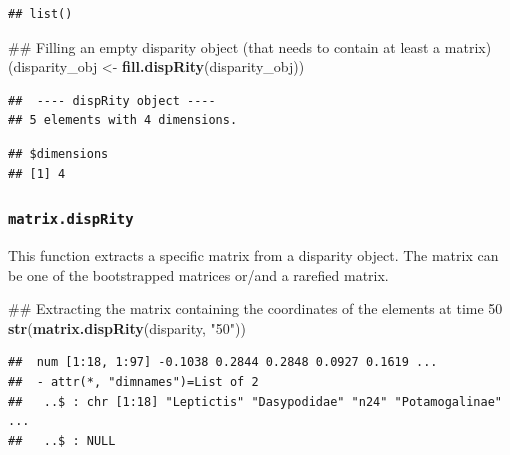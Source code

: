 \documentclass[]{book}
\newenvironment{Shaded}{\begin{snugshade}}{\end{snugshade}}
\newcommand{\KeywordTok}[1]{\textcolor[rgb]{0.13,0.29,0.53}{\textbf{#1}}}
\newcommand{\StringTok}[1]{\textcolor[rgb]{0.31,0.60,0.02}{#1}}
\newcommand{\OperatorTok}[1]{\textcolor[rgb]{0.81,0.36,0.00}{\textbf{#1}}}
\newcommand{\NormalTok}[1]{#1}
\theoremstyle{definition}
\theoremstyle{definition}
\theoremstyle{remark}
\begin{document}
\begin{verbatim}
## list()
\end{verbatim}

\begin{Shaded}
\begin{Highlighting}[]
\NormalTok{## Filling an empty disparity object (that needs to contain at least a matrix)}
\NormalTok{(disparity_obj <-}\StringTok{ }\KeywordTok{fill.dispRity}\NormalTok{(disparity_obj))}
\end{Highlighting}
\end{Shaded}

\begin{verbatim}
##  ---- dispRity object ---- 
## 5 elements with 4 dimensions.
\end{verbatim}

\begin{Shaded}
\end{Shaded}

\begin{verbatim}
## $dimensions
## [1] 4
\end{verbatim}

\subsubsection{\texorpdfstring{\texttt{matrix.dispRity}}{matrix.dispRity}}\label{matrix.disprity}

This function extracts a specific matrix from a disparity object. The
matrix can be one of the bootstrapped matrices or/and a rarefied matrix.

\begin{Shaded}
\begin{Highlighting}[]
\NormalTok{## Extracting the matrix containing the coordinates of the elements at time 50}
\KeywordTok{str}\NormalTok{(}\KeywordTok{matrix.dispRity}\NormalTok{(disparity, }\StringTok{"50"}\NormalTok{))}
\end{Highlighting}
\end{Shaded}

\begin{verbatim}
##  num [1:18, 1:97] -0.1038 0.2844 0.2848 0.0927 0.1619 ...
##  - attr(*, "dimnames")=List of 2
##   ..$ : chr [1:18] "Leptictis" "Dasypodidae" "n24" "Potamogalinae" ...
##   ..$ : NULL
\end{verbatim}
\end{document}

